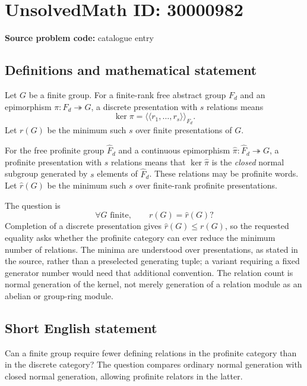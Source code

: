 \documentclass[11pt]{article}
\begin{document}
\section*{UnsolvedMath ID: 30000982}
\textbf{Source problem code:} catalogue entry
\subsection{Definitions and mathematical statement}
Let $G$ be a finite group. For a finite-rank free abstract group $F_d$ and an epimorphism $\pi:F_d\twoheadrightarrow G$, a discrete presentation with $s$ relations means
\[
\ker\pi=\langle\!\langle r_1,\ldots,r_s\rangle\!\rangle_{F_d}.
\]
Let $r(G)$ be the minimum such $s$ over finite presentations of $G$.

For the free profinite group $\widehat F_d$ and a continuous epimorphism $\widehat\pi:\widehat F_d\twoheadrightarrow G$, a profinite presentation with $s$ relations means that $\ker\widehat\pi$ is the \emph{closed} normal subgroup generated by $s$ elements of $\widehat F_d$. These relations may be profinite words. Let $\widehat r(G)$ be the minimum such $s$ over finite-rank profinite presentations.

The question is
\[
\forall G\text{ finite},\qquad r(G)=\widehat r(G)?
\]
Completion of a discrete presentation gives $\widehat r(G)\leq r(G)$, so the requested equality asks whether the profinite category can ever reduce the minimum number of relations. The minima are understood over presentations, as stated in the source, rather than a preselected generating tuple; a variant requiring a fixed generator number would need that additional convention. The relation count is normal generation of the kernel, not merely generation of a relation module as an abelian or group-ring module.
\subsection{Short English statement}
Can a finite group require fewer defining relations in the profinite category than in the discrete category? The question compares ordinary normal generation with closed normal generation, allowing profinite relators in the latter.
\end{document}
